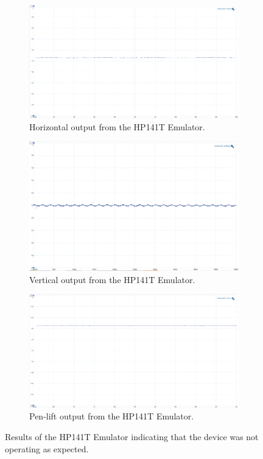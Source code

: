 \documentclass[class=report,11pt,crop=false]{standalone}
\begin{document}
	\begin{figure}[h!]
		\centering
		\begin{subfigure}{.32\textwidth}
			\centering
			\includegraphics[width=0.95\linewidth]{Figures/Results/emulator-horizontal-output}
			\caption{Horizontal output from the HP141T Emulator.}
			\label{fig:emulator-horizontal-output}
		\end{subfigure}%
		\begin{subfigure}{.32\textwidth}
			\centering
			\includegraphics[width=0.95\linewidth]{Figures/Results/emulator-vertical-output}
			\caption{Vertical output from the HP141T Emulator.}
			\label{fig:emulator-vertical-output}
		\end{subfigure}
		\begin{subfigure}{.32\textwidth}
			\centering
			\includegraphics[width=0.95\linewidth]{Figures/Results/emulator-penlift-output}
			\caption{Pen-lift output from the HP141T Emulator.}
			\label{fig:emulator-penlift-output}
		\end{subfigure}
		\caption{Results of the HP141T Emulator indicating that the device was not operating as expected.}
		\label{fig:emulator-output-tests}
	\end{figure} 
	
\end{document}
